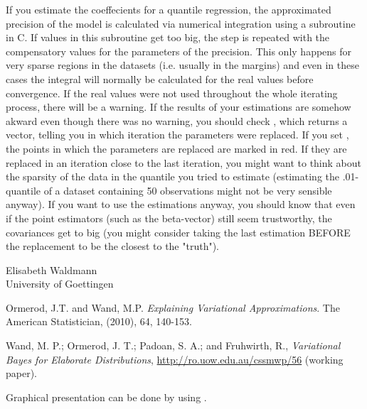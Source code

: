 \documentclass[a4paper]{book}
\begin{document}
\begin{Note}\relax
If you estimate the coeffecients for a quantile regression, the approximated precision of the model is calculated via numerical integration using a subroutine in C. If values in this subroutine get too big, the step is repeated with the compensatory values for the parameters of the precision. This only happens for very sparse regions in the datasets (i.e. usually in the margins) and even in these cases the integral will normally be calculated for the real values before convergence. If the real values were not used throughout the whole iterating process, there will be a warning. If the results of your estimations are somehow akward even though there was no warning, you should check , which returns a vector, telling you in which iteration the parameters were replaced. If you set , the points in which the parameters are replaced are marked in red. If they are replaced in an iteration close to the last iteration, you might want to think about the sparsity of the data in the quantile you tried to estimate (estimating the .01-quantile of a dataset containing 50 observations might not be very sensible anyway). If you want to use the estimations anyway, you should know that even if the point estimators (such as the beta-vector)  still seem trustworthy, the covariances get to big (you might consider taking the last estimation BEFORE the replacement to be the closest to the "truth").
\end{Note}
%
\begin{Author}\relax
Elisabeth Waldmann \\{}
University of Goettingen \\{}

\end{Author}
%
\begin{References}\relax

Ormerod, J.T. and Wand, M.P.
\emph{Explaining Variational Approximations}.
The American Statistician, (2010), 64, 140-153. 

Wand, M. P.; Ormerod, J. T.; Padoan, S. A.; and Fruhwirth, R., \emph{Variational Bayes for Elaborate Distributions},
\url{http://ro.uow.edu.au/cssmwp/56} (working paper).


\end{References}
%
\begin{SeeAlso}\relax
Graphical presentation can be done by using .
\end{SeeAlso}
\end{document}
